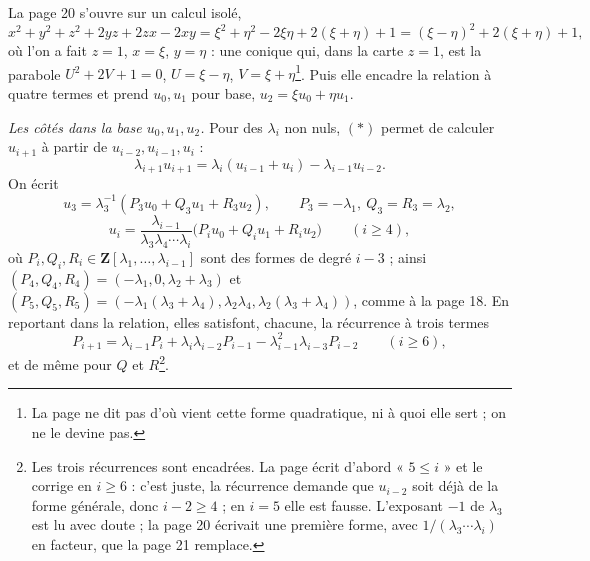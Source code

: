 \documentclass[11pt,a4paper]{article}
\begin{document}
La page 20 s'ouvre sur un calcul isolé,
\[
  x^2 + y^2 + z^2 + 2yz + 2zx - 2xy
  = \xi^2 + \eta^2 - 2\xi\eta + 2(\xi + \eta) + 1
  = (\xi - \eta)^2 + 2(\xi + \eta) + 1 ,
\]
où l'on a fait $z = 1$, $x = \xi$, $y = \eta$ : une conique qui, dans la carte
$z = 1$, est la parabole $U^2 + 2V + 1 = 0$, $U = \xi - \eta$,
$V = \xi + \eta$\footnote{La page ne dit pas d'où vient cette forme
quadratique, ni à quoi elle sert ; on ne le devine pas.}. Puis elle encadre la
relation à quatre termes et prend $u_0, u_1$ pour base, $u_2 = \xi u_0 + \eta
u_1$.

\emph{Les côtés dans la base $u_0, u_1, u_2$.} Pour des $\lambda_i$ non nuls,
$(\ast)$ permet de calculer $u_{i+1}$ à partir de $u_{i-2}, u_{i-1}, u_i$ :
\[
  \lambda_{i+1} u_{i+1} = \lambda_i (u_{i-1} + u_i) - \lambda_{i-1} u_{i-2} .
\]
On écrit
\[
  u_3 = \lambda_3^{-1} (P_3 u_0 + Q_3 u_1 + R_3 u_2), \qquad
  P_3 = -\lambda_1,\ Q_3 = R_3 = \lambda_2 ,
\]
\[
  u_i = \frac{\lambda_{i-1}}{\lambda_3 \lambda_4 \cdots \lambda_i}
  \bigl( P_i u_0 + Q_i u_1 + R_i u_2 \bigr) \qquad (i \geqslant 4),
\]
où $P_i, Q_i, R_i \in \mathbf{Z}[\lambda_1, \ldots, \lambda_{i-1}]$ sont des
formes de degré $i - 3$ ; ainsi $(P_4, Q_4, R_4) = (-\lambda_1, 0, \lambda_2 +
\lambda_3)$ et $(P_5, Q_5, R_5) = (-\lambda_1(\lambda_3 + \lambda_4),
\lambda_2\lambda_4, \lambda_2(\lambda_3 + \lambda_4))$, comme à la page 18. En
reportant dans la relation, elles satisfont, chacune, la récurrence à trois
termes
\[
  P_{i+1} = \lambda_{i-1} P_i + \lambda_i \lambda_{i-2} P_{i-1}
  - \lambda_{i-1}^2 \lambda_{i-3} P_{i-2} \qquad (i \geqslant 6),
\]
et de même pour $Q$ et $R$\footnote{Les trois récurrences sont encadrées. La
page écrit d'abord « $5 \leqslant i$ » et le corrige en $i \geqslant 6$ : c'est
juste, la récurrence demande que $u_{i-2}$ soit déjà de la forme générale, donc
$i - 2 \geqslant 4$ ; en $i = 5$ elle est fausse. L'exposant $-1$ de
$\lambda_3$ est lu avec doute ; la page 20 écrivait une première forme, avec
$1/(\lambda_3 \cdots \lambda_i)$ en facteur, que la page 21 remplace.}.
\end{document}
